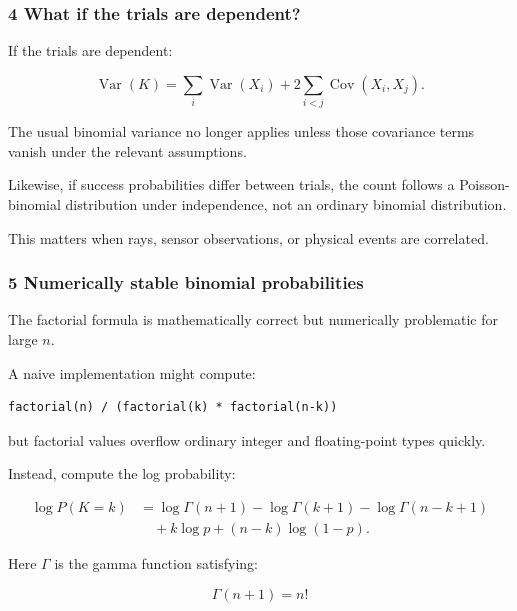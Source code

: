 \subsubsection{4 What if the trials are dependent?}\label{02-foundations-ii-ch023-what-if-the-trials-are-dependent}

\hypertarget{02-foundations-ii-ch023-what-if-the-trials-are-dependent}{}

If the trials are dependent:

\[
 \operatorname{Var}(K)= \sum_i\operatorname{Var}(X_i) + 2\sum_{i<j}\operatorname{Cov}(X_i,X_j).
\]

The usual binomial variance no longer applies unless those covariance terms vanish under the relevant assumptions.

Likewise, if success probabilities differ between trials, the count follows a Poisson-binomial distribution under independence, not an ordinary binomial distribution.

This matters when rays, sensor observations, or physical events are correlated.

\subsubsection{5 Numerically stable binomial probabilities}\label{02-foundations-ii-ch023-numerically-stable-binomial-probabilities}

\hypertarget{02-foundations-ii-ch023-numerically-stable-binomial-probabilities}{}

The factorial formula is mathematically correct but numerically problematic for large \(n\).

A naive implementation might compute:

\begin{verbatim}
factorial(n) / (factorial(k) * factorial(n-k))
\end{verbatim}

but factorial values overflow ordinary integer and floating-point types quickly.

Instead, compute the log probability:

\[
 \begin{aligned} \log P(K=k) &= \log\Gamma(n+1) -\log\Gamma(k+1) -\log\Gamma(n-k+1)\\ &\quad+k\log p+(n-k)\log(1-p). \end{aligned}
\]

Here \(\Gamma\) is the gamma function satisfying:

\[
 \Gamma(n+1)=n!
\]

